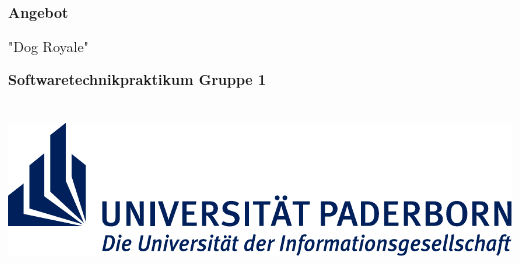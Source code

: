 \begin{titlepage}
    \begin{center}
        \vspace*{3cm}
            
        \Huge
        \textbf{Angebot}
            
        \vspace{0.5cm}
        \LARGE
        "Dog Royale"
            
        \vspace{1.5cm}
            
        \textbf{Softwaretechnikpraktikum Gruppe 1}
        
        \Large
        \thedate\\
        
            
        \vfill
        \includegraphics[width=.5\textwidth]{images/Logo_Uni_Paderborn.pdf}
        
    \end{center}
\end{titlepage}
